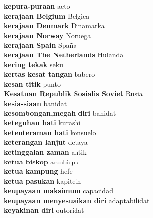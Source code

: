 \textbf{ kepura-puraan  } acto \\
\textbf{ kerajaan Belgium  } Belgica \\
\textbf{ kerajaan Denmark  } Dinamarka \\
\textbf{ kerajaan Norway  } Noruega \\
\textbf{ kerajaan Spain  } Spaña \\
\textbf{ kerajaan The Netherlands  } Hulanda \\
\textbf{ kering tekak  } seku \\
\textbf{ kertas kesat tangan  } babero \\
\textbf{ kesan titik  } punto \\
\textbf{ Kesatuan Republik Sosialis Soviet  } Rusia \\
\textbf{ kesia-siaan  } banidat \\
\textbf{ kesombongan,megah diri  } banidat \\
\textbf{ keteguhan hati  } kurashi \\
\textbf{ ketenteraman hati  } konsuelo \\
\textbf{ keterangan lanjut  } detaya \\
\textbf{ ketinggalan zaman  } antik \\
\textbf{ ketua biskop  } arsobispu \\
\textbf{ ketua kampung  } hefe \\
\textbf{ ketua pasukan  } kapitein \\
\textbf{ keupayaan maksimum  } capacidad \\
\textbf{ keupayaan menyesuaikan diri  } adaptabilidat \\
\textbf{ keyakinan diri  } outoridat \\
